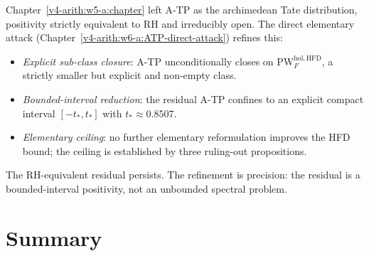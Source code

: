 \begin{remark}
\label{v4-arith:w6-a:rem:compare-w5}
Chapter~\ref{v4-arith:w5-a:chapter} left A-TP as the archimedean Tate
distribution, positivity strictly equivalent to RH and irreducibly
open. The direct elementary attack (Chapter~\ref{v4-arith:w6-a:ATP-direct-attack})
refines this:
\begin{itemize}
\item \emph{Explicit sub-class closure}: A-TP unconditionally
closes on \(\mathrm{PW}^{\mathrm{hol},\mathrm{HFD}}_{F}\), a strictly
smaller but explicit and non-empty class.
\item \emph{Bounded-interval reduction}: the residual A-TP confines
to an explicit compact interval \([-t_{\ast},t_{\ast}]\) with
\(t_{\ast}\approx 0.8507\).
\item \emph{Elementary ceiling}: no further elementary reformulation
improves the HFD bound; the ceiling is established by three ruling-out
propositions.
\end{itemize}
The RH-equivalent residual persists. The refinement is precision:
the residual is a bounded-interval positivity, not an unbounded
spectral problem.
\end{remark}

\section{Summary}
\label{v4-arith:w6-a:summary}

